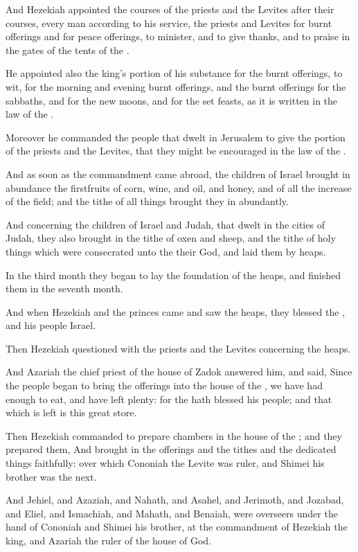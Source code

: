 \verse And Hezekiah appointed the courses of the priests and the Levites after their courses, every man according to his service, the priests and Levites for burnt offerings and for peace offerings, to minister, and to give thanks, and to praise in the gates of the tents of the \LORD.

\verse He appointed also the king's portion of his substance for the burnt offerings, to wit, for the morning and evening burnt offerings, and the burnt offerings for the sabbaths, and for the new moons, and for the set feasts, as it is written in the law of the \LORD.

\verse Moreover he commanded the people that dwelt in Jerusalem to give the portion of the priests and the Levites, that they might be encouraged in the law of the \LORD.

\verse And as soon as the commandment came abroad, the children of Israel brought in abundance the firstfruits of corn, wine, and oil, and honey, and of all the increase of the field; and the tithe of all things brought they in abundantly.

\verse And concerning the children of Israel and Judah, that dwelt in the cities of Judah, they also brought in the tithe of oxen and sheep, and the tithe of holy things which were consecrated unto the \LORD their God, and laid them by heaps.

\verse In the third month they began to lay the foundation of the heaps, and finished them in the seventh month.

\verse And when Hezekiah and the princes came and saw the heaps, they blessed the \LORD, and his people Israel.

\verse Then Hezekiah questioned with the priests and the Levites concerning the heaps.

\verse And Azariah the chief priest of the house of Zadok answered him, and said, Since the people began to bring the offerings into the house of the \LORD, we have had enough to eat, and have left plenty: for the \LORD hath blessed his people; and that which is left is this great store.

\verse Then Hezekiah commanded to prepare chambers in the house of the \LORD; and they prepared them, \verse And brought in the offerings and the tithes and the dedicated things faithfully: over which Cononiah the Levite was ruler, and Shimei his brother was the next.

\verse And Jehiel, and Azaziah, and Nahath, and Asahel, and Jerimoth, and Jozabad, and Eliel, and Ismachiah, and Mahath, and Benaiah, were overseers under the hand of Cononiah and Shimei his brother, at the commandment of Hezekiah the king, and Azariah the ruler of the house of God.

